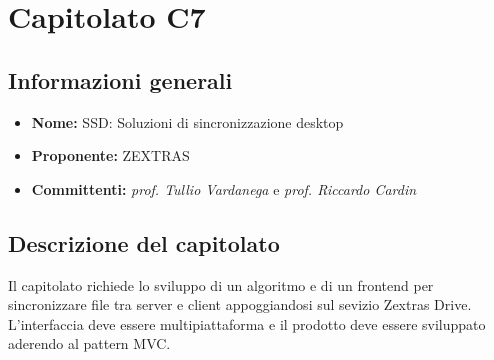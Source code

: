 \section{Capitolato C7}

\subsection{Informazioni generali}
\begin{itemize}
\item \textbf{Nome:} SSD: Soluzioni di sincronizzazione desktop
\item \textbf{Proponente:} ZEXTRAS
\item \textbf{Committenti:} \textit{prof. Tullio Vardanega} e \textit{prof. Riccardo Cardin}
\end{itemize}

\subsection{Descrizione del capitolato}
Il capitolato richiede lo sviluppo di un algoritmo e di un frontend per sincronizzare file tra server e client appoggiandosi sul sevizio Zextras Drive.
L'interfaccia deve essere multipiattaforma e il prodotto deve essere sviluppato aderendo al pattern MVC.


